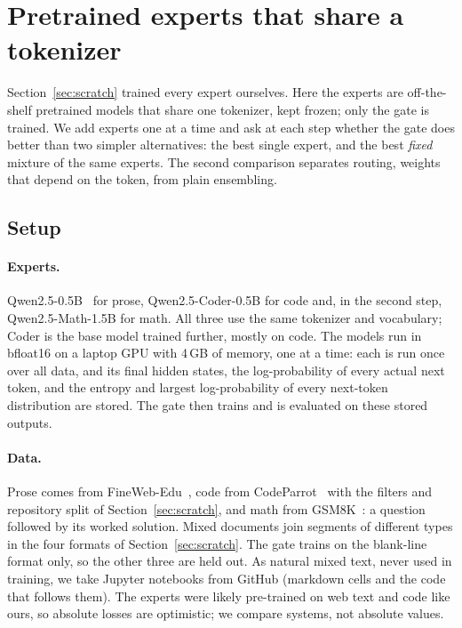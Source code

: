 \documentclass[10pt]{article}
\begin{document}
\section{Pretrained experts that share a tokenizer}
\label{sec:pretrained}
Section~\ref{sec:scratch} trained every expert ourselves. Here the experts are off-the-shelf
pretrained models that share one tokenizer, kept frozen; only the gate is trained. We add
experts one at a time and ask at each step whether the gate does better than two simpler
alternatives: the best single expert, and the best \emph{fixed} mixture of the same experts.
The second comparison separates routing, weights that depend on the token, from plain
ensembling.

\subsection{Setup}
\label{sec:pretrained_setup}

\paragraph{Experts.} Qwen2.5-0.5B~\citep{qwen2025qwen25} for prose, Qwen2.5-Coder-0.5B
\citep{hui2024qwen25coder} for code and, in the second step, Qwen2.5-Math-1.5B
\citep{yang2024qwen25math} for math. All three use the same tokenizer and vocabulary; Coder
is the base model trained further, mostly on code. The models run in bfloat16 on a laptop GPU
with 4\,GB of memory, one at a time: each is run once over all data, and its final hidden
states, the log-probability of every actual next token, and the entropy and largest
log-probability of every next-token distribution are stored. The gate then trains and is
evaluated on these stored outputs.

\paragraph{Data.} Prose comes from FineWeb-Edu~\citep{penedo2024fineweb}, code from
CodeParrot~\citep{codeparrot} with the filters and repository split of
Section~\ref{sec:scratch}, and math from GSM8K~\citep{cobbe2021gsm8k}: a question followed by
its worked solution. Mixed documents join segments of different types in the four formats of
Section~\ref{sec:scratch}. The gate trains on the blank-line format only, so the other three
are held out. As natural mixed text, never used in training, we take Jupyter notebooks from
GitHub (markdown cells and the code that follows them). The experts were likely
pre-trained on web text and code like ours, so absolute losses are optimistic; we compare systems, not absolute values.
\end{document}
